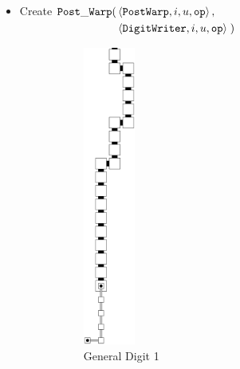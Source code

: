 \begin{itemize}
        \item
        Create
        $\begin{aligned}[t]
            {\tt Post\_Warp}(& \left \langle {\tt PostWarp},    i, u, {\tt op} \right\rangle, \\
                      & \left \langle {\tt DigitWriter}, i, u, {\tt op} \right\rangle \;)
        \end{aligned}$

        \begin{figure}[H]
            \begin{subfigure}[t]{0.2\textwidth}
                \centering
                \includegraphics[width=0.2\textwidth]{warping/post_warp_general_digit1}
                \caption{\label{fig:post_warp_general_digit1} General Digit 1}
            \end{subfigure}%
            ~
            \begin{subfigure}[t]{0.2\textwidth}
                \centering

\end{subfigure}
\end{figure}
\end{itemize}
